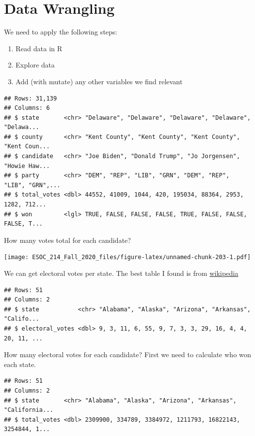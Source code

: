 \documentclass[
]{book}
\providecommand{\tightlist}{%
  \setlength{\itemsep}{0pt}\setlength{\parskip}{0pt}}
\begin{document}
\hypertarget{data-wrangling-1}{%
\section{Data Wrangling}\label{data-wrangling-1}}

We need to apply the following steps:

\begin{enumerate}
\def\labelenumi{\arabic{enumi}.}
\tightlist
\item
  Read data in R
\item
  Explore data
\item
  Add (with mutate) any other variables we find relevant
\end{enumerate}

\begin{verbatim}
## Rows: 31,139
## Columns: 6
## $ state       <chr> "Delaware", "Delaware", "Delaware", "Delaware", "Delawa...
## $ county      <chr> "Kent County", "Kent County", "Kent County", "Kent Coun...
## $ candidate   <chr> "Joe Biden", "Donald Trump", "Jo Jorgensen", "Howie Haw...
## $ party       <chr> "DEM", "REP", "LIB", "GRN", "DEM", "REP", "LIB", "GRN",...
## $ total_votes <dbl> 44552, 41009, 1044, 420, 195034, 88364, 2953, 1282, 712...
## $ won         <lgl> TRUE, FALSE, FALSE, FALSE, TRUE, FALSE, FALSE, FALSE, T...
\end{verbatim}

How many votes total for each candidate?

\texttt{[image: ESOC\_214\_Fall\_2020\_files/figure-latex/unnamed-chunk-203-1.pdf]}

We can get electoral votes per state. The best table I found is from \href{https://en.wikipedia.org/wiki/United_States_Electoral_College\#:~:text=Electoral\%20votes\%2C\%20out\%20of\%20538,entitled\%20to\%20at\%20least\%203.}{wikipedia}

\begin{verbatim}
## Rows: 51
## Columns: 2
## $ state           <chr> "Alabama", "Alaska", "Arizona", "Arkansas", "Califo...
## $ electoral_votes <dbl> 9, 3, 11, 6, 55, 9, 7, 3, 3, 29, 16, 4, 4, 20, 11, ...
\end{verbatim}

How many electoral votes for each candidate? First we need to calculate who won each state.

\begin{verbatim}
## Rows: 51
## Columns: 2
## $ state       <chr> "Alabama", "Alaska", "Arizona", "Arkansas", "California...
## $ total_votes <dbl> 2309900, 334789, 3384972, 1211793, 16822143, 3254844, 1...
\end{verbatim}
\end{document}
